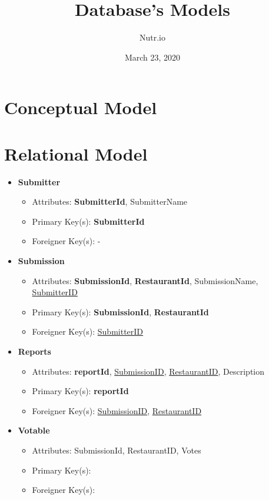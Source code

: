\documentclass{article}
\title{Database's Models}
\date{March 23, 2020}
\author{Nutr.io}
\begin{document}
\maketitle

\section{Conceptual Model}

\section{Relational Model}
    \begin{itemize}
        \item \textbf{Submitter}        
        \begin{itemize}
            \item Attributes: \textbf{SubmitterId}, SubmitterName
            \item Primary Key(s): \textbf{SubmitterId}
            \item Foreigner Key(s): -
        \end{itemize}

        \item \textbf{Submission}                
        \begin{itemize}
            \item Attributes: \textbf{SubmissionId}, \textbf{RestaurantId}, SubmissionName, \underline{SubmitterID}
            \item Primary Key(s): \textbf{SubmissionId}, \textbf{RestaurantId}
            \item Foreigner Key(s): \underline{SubmitterID}
        \end{itemize}

        \item \textbf{Reports}
        \begin{itemize}
            \item Attributes: \textbf{reportId}, \underline{SubmissionID}, \underline{RestaurantID}, Description
            \item Primary Key(s): \textbf{reportId}
            \item Foreigner Key(s): \underline{SubmissionID}, \underline{RestaurantID}
        \end{itemize}
            
        \item \textbf{Votable}
        \begin{itemize}
            \item Attributes: SubmissionId, RestaurantID, Votes 
            \item Primary Key(s): 
            \item Foreigner Key(s):
        \end{itemize}


\end{itemize}
\end{document}
